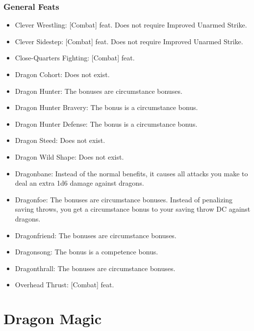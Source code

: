 \subsubsection{General Feats}
\begin{itemize}
\item Clever Wrestling: [Combat] feat. Does not require Improved Unarmed Strike.
\item Clever Sidestep: [Combat] feat. Does not require Improved Unarmed Strike.
\item Close-Quarters Fighting: [Combat] feat.
\item Dragon Cohort: Does not exist.
\item Dragon Hunter: The bonuses are circumstance bonuses.
\item Dragon Hunter Bravery: The bonus is a circumstance bonus.
\item Dragon Hunter Defense: The bonus is a circumstance bonus.
\item Dragon Steed: Does not exist.
\item Dragon Wild Shape: Does not exist.
\item Dragonbane: Instead of the normal benefits, it causes all attacks you make to deal an extra 1d6 damage against dragons.
\item Dragonfoe: The bonuses are circumstance bonuses. Instead of penalizing saving throws, you get a  circumstance bonus to your saving throw DC against dragons.
\item Dragonfriend: The bonuses are circumstance bonuses.
\item Dragonsong: The bonus is a competence bonus.
\item Dragonthrall: The bonuses are circumstance bonuses.
\item Overhead Thrust: [Combat] feat.
\end{itemize}
\section{Dragon Magic}
